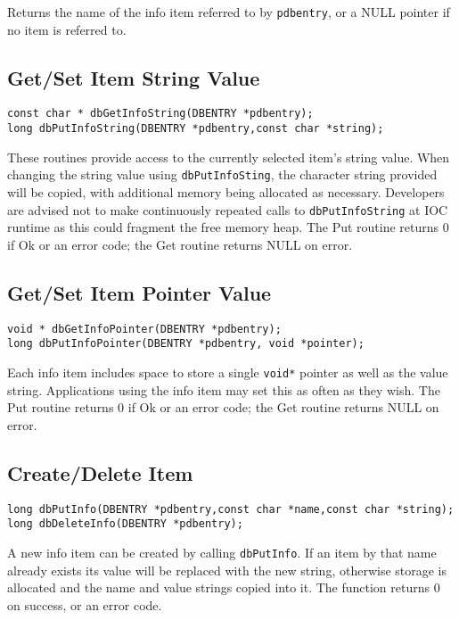 Returns the name of the info item referred to by \verb|pdbentry|, or a NULL pointer if no item is referred to.

\subsection{Get/Set Item String Value}

\begin{verbatim}
const char * dbGetInfoString(DBENTRY *pdbentry);
long dbPutInfoString(DBENTRY *pdbentry,const char *string);
\end{verbatim}

These routines provide access to the currently selected item's string value.
When changing the string value using \verb|dbPutInfoSting|, the character string provided will be copied, with additional memory being allocated as necessary.
Developers are advised not to make continuously repeated calls to \verb|dbPutInfoString| at IOC runtime as this could fragment 
the free memory heap.
The Put routine returns 0 if Ok or an error code; the Get routine returns NULL on error.

\subsection{Get/Set Item Pointer Value}

\begin{verbatim}
void * dbGetInfoPointer(DBENTRY *pdbentry);
long dbPutInfoPointer(DBENTRY *pdbentry, void *pointer);
\end{verbatim}

Each info item includes space to store a single \verb|void*| pointer as well as the value string.
Applications using the info item may set this as often as they wish.
The Put routine returns 0 if Ok or an error code; the Get routine returns NULL on error.

\subsection{Create/Delete Item}

\begin{verbatim}
long dbPutInfo(DBENTRY *pdbentry,const char *name,const char *string);
long dbDeleteInfo(DBENTRY *pdbentry);
\end{verbatim}

A new info item can be created by calling \verb|dbPutInfo|.
If an item by that name already exists its value will be replaced with the new string, otherwise storage is allocated and the name and value strings copied into it.
The function returns 0 on success, or an error code.

